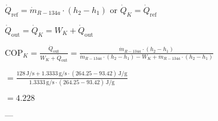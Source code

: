\( \dot{Q}_{\text{ref}} = \dot{m}_{R-134a} \cdot (h_2 - h_1) \)  
or \( \dot{Q}_K = \dot{Q}_{\text{ref}} \)  

\( \dot{Q}_{\text{out}} = \dot{Q}_K = W_K + \dot{Q}_{\text{out}} \)  

\( \text{COP}_K = \frac{\dot{Q}_{\text{out}}}{W_K + \dot{Q}_{\text{out}}} = \frac{\dot{m}_{R-134a} \cdot (h_2 - h_1)}{\dot{m}_{R-134a} \cdot (h_2 - h_1) - W_K + \dot{m}_{R-134a} \cdot (h_2 - h_1)} \)  

\( = \frac{128 \, \text{J/s} + 1.3333 \, \text{g/s} \cdot (264.25 - 93.42) \, \text{J/g}}{1.3333 \, \text{g/s} \cdot (264.25 - 93.42) \, \text{J/g}} \)  

\( = 4.228 \)  

---